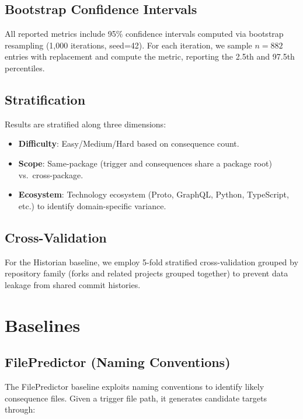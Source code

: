 \documentclass[sigconf,nonacm]{acmart}
\begin{document}
\subsection{Bootstrap Confidence Intervals}

All reported metrics include 95\% confidence intervals computed via bootstrap resampling (1{,}000 iterations, seed=42). For each iteration, we sample $n=882$ entries with replacement and compute the metric, reporting the 2.5th and 97.5th percentiles.

\subsection{Stratification}

Results are stratified along three dimensions:
\begin{itemize}
    \item \textbf{Difficulty}: Easy/Medium/Hard based on consequence count.
    \item \textbf{Scope}: Same-package (trigger and consequences share a package root) vs.\ cross-package.
    \item \textbf{Ecosystem}: Technology ecosystem (Proto, GraphQL, Python, TypeScript, etc.) to identify domain-specific variance.
\end{itemize}

\subsection{Cross-Validation}

For the Historian baseline, we employ 5-fold stratified cross-validation grouped by repository family (forks and related projects grouped together) to prevent data leakage from shared commit histories.

\section{Baselines}
\label{sec:baselines}

\subsection{FilePredictor (Naming Conventions)}

The FilePredictor baseline exploits naming conventions to identify likely consequence files. Given a trigger file path, it generates candidate targets through:
\end{document}
